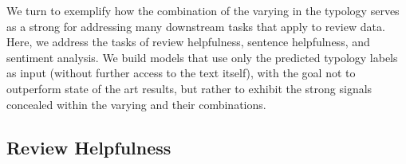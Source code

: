We turn to exemplify how the combination of the varying \taxtypes{} in the typology serves as a strong  for addressing many downstream tasks that apply to review data.
Here, we address the tasks of review helpfulness, sentence helpfulness, and sentiment analysis.
We build models that use only the predicted typology labels as input (without further access to the text itself), with the goal
not to outperform state of the art results, but rather to exhibit the strong signals concealed within the varying \taxtypes{} and their combinations.








\subsection{Review Helpfulness}
\label{sec_experiments_review_helpfulness}

